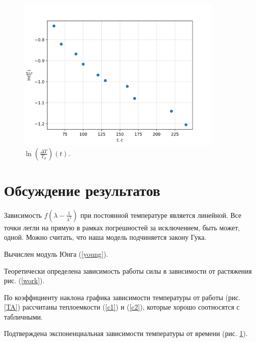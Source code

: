\documentclass[a4paper,12pt]{article} %
\begin{document}
\begin{figure}[h!]
\begin{center}
\includegraphics[width=0.89\textwidth]{T(t).png}
\caption{$\ln(\frac{\Delta T}{T_0})(t)$.}\label{Tt}
\end{center}
\end{figure}

\FloatBarrier

\section{Обсуждение результатов}

Зависимость $f(\lambda - \frac{1}{\lambda^2})$ при постоянной температуре является линейной. Все точки легли на прямую в рамках погрешностей за исключением, быть может, одной. Можно считать, что наша модель подчиняется закону Гука.

Вычислен модуль Юнга (\ref{young}).

Теоретически определена зависимость работы силы в зависимости от растяжения рис. (\ref{work}).

По коэффициенту наклона графика зависимости температуры от работы (рис. \ref{TA}) рассчитаны теплоемкости (\ref{c1}) и (\ref{c2}), которые хорошо соотносятся с табличными.

Подтверждена экспоненциальная зависимости температуры от времени (рис. \ref{Tt}).
\end{document}
